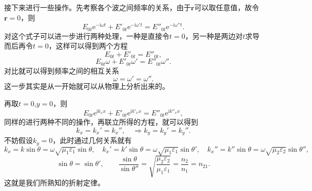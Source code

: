 \documentclass[UTF8]{ctexbook}
\newcommand{\e}{\mathrm{e}}
\renewcommand{\b}{\boldsymbol}
\renewcommand{\i}{\mathrm{i}}
\numberwithin{equation}{chapter}
\begin{document}
	接下来进行一些操作。先考察各个波之间频率的关系，由于$\b{r}$可以取任意值，故令$\b{r}=0$，则
	\[E_{0t}\e^{-\i\omega t}+E'_{0t}\e^{-\i\omega' t}=E''_{0t}\e^{-\i\omega'' t}.\]
	对这个式子可以进一步进行两种处理，一种是直接令$t=0$，另一种是两边对$t$求导而后再令$t=0$，这样可以得到两个方程
	\[E_{0t}+E'_{0t}=E''_{0t},\]
	\[E_{0t}\omega+E'_{0t}\omega'=E''_{0t}\omega''.\]
	对比就可以得到频率之间的相互关系
	\[\omega=\omega'=\omega''.\]
	这一步其实是从一开始就可以从物理上分析出来的。
	
	再取$t=0$,$y=0$，则
	\[E_{0t}\e^{\i k_x x}+E'_{0t}\e^{\i k'_x x}=E''_{0t}\e^{\i k''_x x},\]
	同样的进行两种不同的操作，再联立所得的方程，就可以得到
	\[k_x=k_x'=k_x'',\quad \Rightarrow k_y=k_y'=k_y''.\]
	不妨假设$k_y=0$，此时通过几何关系就有
	\[k_x=k\sin\theta=\omega\sqrt{\mu_1\varepsilon_1}\sin\theta,\quad k_x'=k'\sin\theta=\omega\sqrt{\mu_1\varepsilon_1}\sin\theta',\quad k_x''=k''\sin\theta=\omega\sqrt{\mu_2\varepsilon_2}\sin\theta'',\]
	\[\sin\theta=\sin\theta',\qquad \frac{\sin\theta}{\sin\theta''}=\sqrt{\frac{\mu_2\varepsilon_2}{\mu_1\varepsilon_1}}=\frac{n_2}{n_1}=n_{21}.\]
	这就是我们所熟知的折射定律。
	
\end{document}
